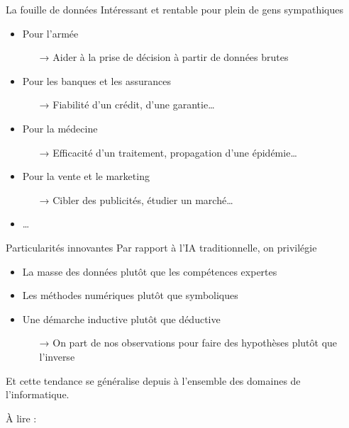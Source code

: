 \documentclass[hyperref={unicode}, xcolor={svgnames}, french]{beamer}
\begin{document}
\begin{frame}{La fouille de données}
    Intéressant et rentable pour plein de gens sympathiques
    \begin{itemize}
        \item Pour l'armée
            \begin{itemize}
                \item[→] Aider à la \alert{prise de décision} à partir de données brutes
            \end{itemize}
        \item Pour les banques et les assurances
            \begin{itemize}
                \item[→] Fiabilité d'un crédit, d'une garantie…
            \end{itemize}
        \item Pour la médecine
            \begin{itemize}
                \item[→] Efficacité d'un traitement, propagation d'une épidémie…
            \end{itemize}
        \item Pour la vente et le marketing
            \begin{itemize}
                \item[→] \alert{Cibler} des publicités, étudier un marché…
            \end{itemize}
        \item …
    \end{itemize}
\end{frame}

\begin{frame}{Particularités innovantes}
    Par rapport à l'IA traditionnelle, on privilégie
    \begin{itemize}
        \item \alert{La masse des données} plutôt que les compétences expertes
        \item \alert{Les méthodes numériques} plutôt que symboliques
        \item Une démarche \alert{inductive} plutôt que déductive
            \begin{itemize}
                \item[→] On part de nos observations pour faire des hypothèses plutôt que l'inverse
            \end{itemize}

    \end{itemize}
    Et cette tendance se généralise depuis à l'ensemble des domaines de l'informatique.

    À lire :  \parencite{church2011pendulum}
\end{frame}
\end{document}
